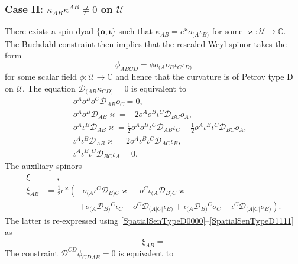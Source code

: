 \documentclass[10pt,a4paper]{article}
\newcommand\omicron{o}
\theoremstyle{plain}
\begin{document}
\subsubsection{Case II: $\kappa_{AB}\kappa^{AB}\neq 0$ on $\mathcal{U}$}

There exists a spin dyad $\lbrace \bm\omicron, \bm\iota\rbrace$ such that $\kappa_{AB} = e^{\varkappa} \omicron_{(A}\iota_{B)}$ for some $\varkappa:\mathcal{U}\rightarrow\mathbb{C}$. The Buchdahl constraint then implies that the rescaled Weyl spinor takes the form
\[ \phi_{ABCD}= \phi \omicron_{(A}\omicron_B\iota_C\iota_{D)}\]
for some scalar field $\phi:\mathcal{U}\rightarrow\mathbb{C}$ and hence that the curvature is of Petrov type D on $\mathcal{U}$. The equation $\mathcal{D}_{(AB}\kappa_{CD)}=0$ is equivalent to 
\begin{subequations}
\begin{eqnarray}
&& \omicron^A\omicron^B\omicron^C\mathcal{D}_{AB}\omicron_C=0,\label{SpatialSenTypeD0000}\\
&& o^{A} o^{B} \mathcal{D}_{AB}\varkappa = -2 o^{A} o^{B} \iota^{C} \mathcal{D}_{BC}o_{A},\\
&& o^{A} \iota^{B} \mathcal{D}_{AB}\varkappa = \tfrac{1}{2} o^{A} o^{B} \iota^{C} \mathcal{D}_{AB}\iota_{C} -  \tfrac{1}{2} o^{A} \iota^{B} \iota^{C} \mathcal{D}_{BC}o_{A},\\
&& \iota^{A} \iota^{B} \mathcal{D}_{AB}\varkappa = 2 o^{A} \iota^{B} \iota^{C} \mathcal{D}_{AC}\iota_{B},\\
&& \iota^{A} \iota^{B} \iota^{C} \mathcal{D}_{BC}\iota_{A} = 0.\label{SpatialSenTypeD1111}
\end{eqnarray}
\end{subequations}
The auxiliary spinors 
\begin{align*} 
\xi &= ,\\
\xi_{AB} &= \tfrac{1}{2} e^{\varkappa} \left(-   o_{(A}\iota^{C}\mathcal{D}_{B)C}\varkappa-   o^{C}\iota_{(A}\mathcal{D}_{B)C}\varkappa\right.\\
& \qquad\qquad\left.+o_{(A}\mathcal{D}_{B)}{}^{C}\iota_{C} -  o^{C}\mathcal{D}_{(A|C|}\iota_{B)} + \iota_{(A}\mathcal{D}_{B)}{}^{C}o_{C} -  \iota^{C}\mathcal{D}_{(A|C|}o_{B)} \right).
\end{align*}
The latter is re-expressed using \eqref{SpatialSenTypeD0000}--\eqref{SpatialSenTypeD1111} as 
\[ \xi_{AB} = \]
The constraint $\mathcal{D}^{CD}\phi_{CDAB}=0$ is equivalent to 
\end{document}

